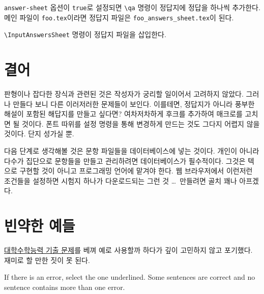 \documentclass[a4paper]{oblivoir}
\begin{document}
\begin{boxedverbatim}
\InputAnswersSheet
\end{boxedverbatim}

\texttt{answer-sheet} 옵션이 \texttt{true}로 설정되면 \verb|\qa| 명령이 정답지에 정답을 하나씩 추가한다.
메인 파일이 \texttt{foo.tex}이라면 정답지 파일은 \verb|foo_answers_sheet.tex|이 된다.

\verb|\InputAnswersSheet| 명령이 정답지 파일을 삽입한다.

\section{결어}

판형이나 잡다한 장식과 관련된 것은 작성자가 궁리할 일이어서 고려하지 않았다.
그러나 만들다 보니 다른 이러저러한 문제들이 보인다.
이를테면, 정답지가 아니라 풍부한 해설이 포함된 해답지를 만들고 싶다면? 
여차저차하게 후크를 추가하여 매크로를 고치면 될 것이다.
폰트 따위를 설정 명령을 통해 변경하게 만드는 것도 그다지 어렵지 않을 것이다.
단지 성가실 뿐.

다음 단계로 생각해볼 것은 문항 파일들을 데이터베이스에 넣는 것이다.
개인이 아니라 다수가 집단으로 문항들을 만들고 관리하려면 데이터베이스가 필수적이다.
그것은 텍으로 구현할 것이 아니고 프로그래밍 언어에 맡겨야 한다.
웹 브라우저에서 이런저런 조건들을 설정하면 시험지 하나가 다운로드되는 그런 것 \ldots\ 만들려면 골치 꽤나 아프겠다.

\section{빈약한 예들}

\href{https://www.suneung.re.kr/boardCnts/list.do?boardID=1500234&m=0403&s=suneung}{대학수학능력 기출 문제}를 베껴 예로 사용할까 하다가 깊이 고민하지 않고 포기했다. 
재미로 할 만한 짓이 못 된다.

\begin{boxedverbatim}
\end{boxedverbatim}

\begin{QAwrite}

\begin{premise}[3]
If there is an error, select the one underlined. Some sentences are correct and no sentence contains more than one error. 
\end{premise}




\end{QAwrite}
\end{document}
